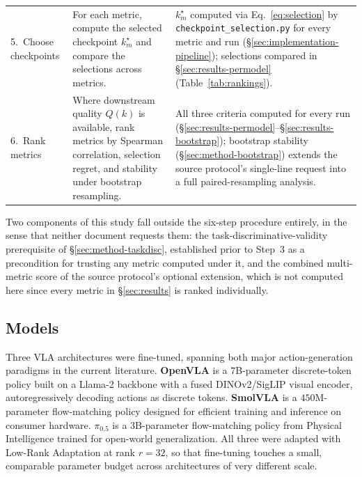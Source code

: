\documentclass[11pt]{article}
\numberwithin{equation}{section}
\numberwithin{table}{section}
\numberwithin{figure}{section}
\begin{document}
\begin{table}[h]
\begin{tabular}{p{1.6cm}p{5.6cm}p{6.3cm}}
5.\ Choose checkpoints &
For each metric, compute the selected checkpoint $k_m^\star$ and compare the selections across metrics. &
$k_m^\star$ computed via Eq.~\ref{eq:selection} by \texttt{checkpoint\_selection.py} for every metric and
run (\S\ref{sec:implementation-pipeline}); selections compared in \S\ref{sec:results-permodel}
(Table~\ref{tab:rankings}). \\
6.\ Rank metrics &
Where downstream quality $Q(k)$ is available, rank metrics by Spearman correlation, selection regret,
and stability under bootstrap resampling. &
All three criteria computed for every run (\S\ref{sec:results-permodel}--\S\ref{sec:results-bootstrap});
bootstrap stability (\S\ref{sec:method-bootstrap}) extends the source protocol's single-line request into
a full paired-resampling analysis. \\
\bottomrule
\end{tabular}
\end{table}

Two components of this study fall outside the six-step procedure entirely, in the sense that neither
document requests them: the task-discriminative-validity prerequisite of \S\ref{sec:method-taskdisc},
established prior to Step~3 as a precondition for trusting any metric computed under it, and the
combined multi-metric score of the source protocol's optional extension, which is not computed here
since every metric in \S\ref{sec:results} is ranked individually.

\subsection{Models}
\label{sec:implementation-models}

Three VLA architectures were fine-tuned, spanning both major action-generation paradigms in the current
literature. \textbf{OpenVLA} \cite{kim2024openvla} is a $7$B-parameter discrete-token policy built on a
Llama-2 backbone with a fused DINOv2/SigLIP visual encoder, autoregressively decoding actions as discrete
tokens. \textbf{SmolVLA} \cite{shukor2025smolvla} is a $450$M-parameter flow-matching policy designed for
efficient training and inference on consumer hardware. \textbf{$\pi_{0.5}$} \cite{black2025pi05} is a
$3$B-parameter flow-matching policy from Physical Intelligence trained for open-world generalization. All
three were adapted with Low-Rank Adaptation \cite{hu2021lora} at rank $r{=}32$, so that fine-tuning
touches a small, comparable parameter budget across architectures of very different scale.
\end{document}

